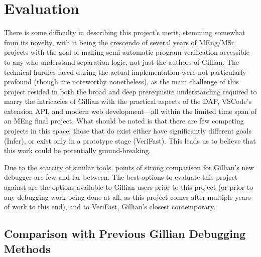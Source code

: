 
\chapter{Evaluation}\label{sec:eval}

There is some difficulty in describing this project's merit, stemming somewhat
from its novelty, with it being the crescendo of several years of MEng/MSc
projects with the goal of making semi-automatic program verification accessible
to any who understand separation logic, not just the authors of Gillian. The
technical hurdles faced during the actual implementation were not particularly
profound (though are noteworthy nonetheless), as the main challenge of this
project resided in both the broad and deep prerequisite understanding required
to marry the intricacies of Gillian with the practical aspects of the DAP,
VSCode's extension API, and modern web development---all within the limited time
span of an MEng final project. What should be noted is that there are few
competing projects in this space; those that do exist either have significantly
different goals (Infer), or exist only in a prototype stage (VeriFast). This
leads us to believe that this work could be potentially ground-breaking.

Due to the scarcity of similar tools, points of strong comparison for Gillian's
new debugger are few and far between. The best options to evaluate this project
against are the options available to Gillian users prior to this project (or
prior to any debugging work being done at all, as this project comes after
multiple years of work to this end), and to VeriFast, Gillian's closest
contemporary.

\section{Comparison with Previous Gillian Debugging Methods}

